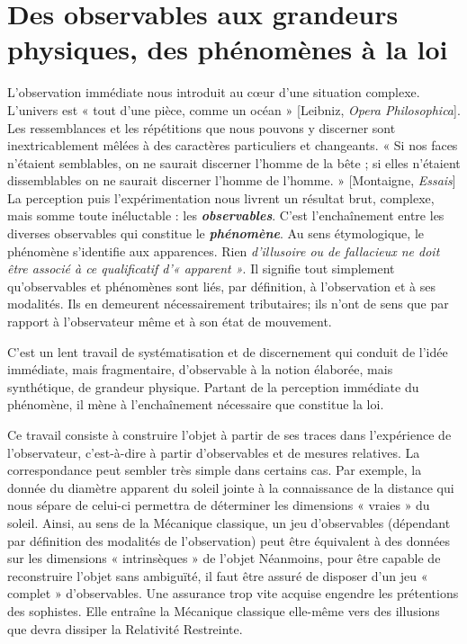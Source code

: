 \section{Des observables aux grandeurs physiques,
des phénomènes à la loi}

L'observation immédiate nous introduit au cœur d’une situation
complexe. L'univers est « tout d’une pièce, comme un océan »
{\footnotesize [{\sc Leibniz}, {\it Opera Philosophica}]}.
Les ressemblances et les répétitions que nous pouvons y discerner sont inextricablement
mêlées à des caractères particuliers et changeants. « Si nos
faces n’étaient semblables,
on ne saurait discerner
l’homme de la bête ; si elles n’étaient dissemblables on ne saurait discerner
l’homme de l’homme. »
{\footnotesize [{\sc Montaigne}, {\it Essais}]}
La perception puis l’expérimentation nous
livrent un résultat brut, complexe, mais somme toute inéluctable : les
\textbf{\textit {observables}}{\it }. C’est l’enchaînement entre les diverses observables qui constitue
le \textbf{\textit {phénomène}}{\it }. Au sens étymologique, le phénomène s’identifie aux
apparences. Rien {\it d’illusoire ou de fallacieux ne doit être associé à ce
qualificatif d’« apparent »}. Il signifie tout simplement qu’observables et
phénomènes sont liés, par définition, à l’observation et à ses modalités.
Ils en demeurent nécessairement tributaires; ils n’ont de sens que par
rapport à l’observateur même et à son état de mouvement.

C’est un lent travail de systématisation et de discernement qui conduit
de l’idée immédiate, mais fragmentaire, d’observable à la notion
élaborée, mais synthétique, de grandeur physique. Partant de la perception
immédiate du phénomène, il mène à l’enchaînement nécessaire que
constitue la loi.

Ce travail consiste à construire l’objet à partir de ses traces dans
l'expérience de l’observateur, c’est-à-dire à partir d’observables et de
mesures relatives. La correspondance peut sembler très simple dans
certains cas. Par exemple, la donnée du diamètre apparent du soleil
jointe à la connaissance de la distance qui nous sépare de celui-ci permettra
de déterminer les dimensions « vraies » du soleil. Ainsi, au sens
de la Mécanique classique, un jeu d’observables (dépendant par définition
des modalités de l’observation) peut être équivalent à des données
sur les dimensions « intrinsèques » de l’objet
Néanmoins, pour être
capable de reconstruire l’objet sans ambiguïté, il faut être assuré de
disposer d’un jeu « complet » d’observables. Une assurance trop vite
acquise engendre les prétentions des sophistes. Elle entraîne la Mécanique
classique elle-même vers des illusions que devra dissiper la
Relativité Restreinte.


